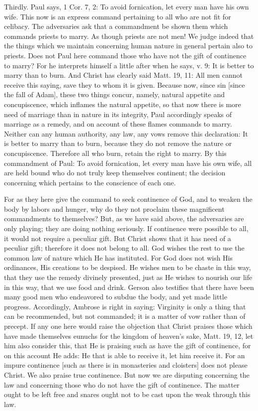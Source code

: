 Thirdly.  Paul says, 1 Cor. 7, 2: To avoid fornication, let every man
have his own wife.  This now is an express command pertaining to all
who are not fit for celibacy.  The adversaries ask that a commandment
be shown them which commands priests to marry.  As though priests are
not men!  We judge indeed that the things which we maintain
concerning human nature in general pertain also to priests.  Does not
Paul here command those who have not the gift of continence to marry?
For he interprets himself a little after when he says, v. 9: It is
better to marry than to burn.  And Christ has clearly said Matt. 19,
11: All men cannot receive this saying, save they to whom it is given.
Because now, since sin [since the fall of Adam], these two things
concur, namely, natural appetite and concupiscence, which inflames
the natural appetite, so that now there is more need of marriage than
in nature in its integrity, Paul accordingly speaks of marriage as a
remedy, and on account of these flames commands to marry.  Neither
can any human authority, any law, any vows remove this declaration:
It is better to marry than to burn, because they do not remove the
nature or concupiscence.  Therefore all who burn, retain the right to
marry.  By this commandment of Paul: To avoid fornication, let every
man have his own wife, all are held bound who do not truly keep
themselves continent; the decision concerning which pertains to the
conscience of each one.

For as they here give the command to seek continence of God, and to
weaken the body by labors and hunger, why do they not proclaim these
magnificent commandments to themselves?  But, as we have said above,
the adversaries are only playing; they are doing nothing seriously.
If continence were possible to all, it would not require a peculiar
gift.  But Christ shows that it has need of a peculiar gift;
therefore it does not belong to all.  God wishes the rest to use the
common law of nature which He has instituted.  For God does not wish
His ordinances, His creations to be despised.  He wishes men to be
chaste in this way, that they use the remedy divinely presented, just
as He wishes to nourish our life in this way, that we use food and
drink.  Gerson also testifies that there have been many good men who
endeavored to subdue the body, and yet made little progress.
Accordingly, Ambrose is right in saying: Virginity is only a thing
that can be recommended, but not commanded; it is a matter of vow
rather than of precept.  If any one here would raise the objection
that Christ praises those which have made themselves eunuchs for the
kingdom of heaven's sake, Matt. 19, 12, let him also consider this,
that He is praising such as have the gift of continence, for on this
account He adds: He that is able to receive it, let him receive it.
For an impure continence [such as there is in monasteries and
cloisters] does not please Christ.  We also praise true continence.
But now we are disputing concerning the law and concerning those who
do not have the gift of continence.  The matter ought to be left free
and snares ought not to be cast upon the weak through this law.

